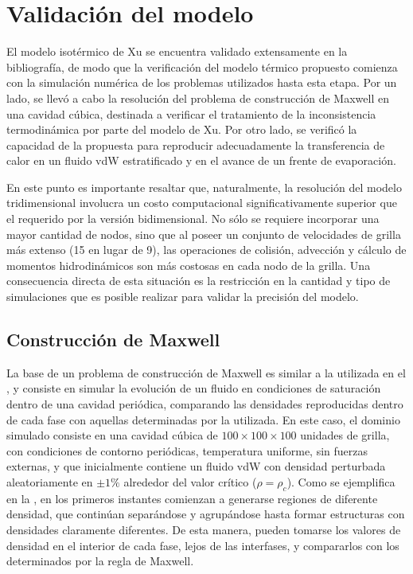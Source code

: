 \section{Validaci\'on del modelo}

El modelo isot\'ermico de Xu  se encuentra validado extensamente en la bibliograf\'ia, de modo que la verificaci\'on del modelo t\'ermico propuesto comienza con la simulaci\'on num\'erica de los problemas utilizados hasta esta etapa. Por un lado, se llev\'o a cabo la resoluci\'on del problema de construcci\'on de Maxwell en una cavidad c\'ubica, destinada a verificar el tratamiento de la inconsistencia termodin\'amica por parte del modelo de Xu. Por otro lado, se verific\'o la capacidad de la \lbe{} propuesta para reproducir adecuadamente la transferencia de calor en un fluido vdW estratificado y en el avance de un frente de evaporaci\'on.

En este punto es importante resaltar que, naturalmente, la resoluci\'on del modelo tridimensional involucra un costo computacional significativamente superior que el requerido por la versi\'on bidimensional. No s\'olo se requiere incorporar una mayor cantidad de nodos, sino que al poseer un conjunto de velocidades de grilla m\'as extenso (15 en lugar de 9), las operaciones de colisi\'on, advecci\'on y c\'alculo de momentos hidrodin\'amicos son m\'as costosas en cada nodo de la grilla. Una consecuencia directa de esta situaci\'on es la restricci\'on en la cantidad y tipo de simulaciones que es posible realizar para validar la precisi\'on del modelo. 

\newpage
\subsection{Construcci\'on de Maxwell} 

La base de un problema de construcci\'on de Maxwell es similar a la utilizada en el , y consiste en simular la evoluci\'on de un fluido en condiciones de saturaci\'on dentro de una cavidad peri\'odica, comparando las densidades reproducidas dentro de cada fase con aquellas determinadas por la \eos{} utilizada. En este caso, el dominio simulado consiste en una cavidad c\'ubica de $100 \times 100 \times 100$ unidades de grilla, con condiciones de contorno peri\'odicas, temperatura uniforme, sin fuerzas externas, y que inicialmente contiene un fluido vdW con densidad perturbada aleatoriamente en  $\pm 1\%$ alrededor del valor cr\'itico ($\rho=\rho_c$). Como se ejemplifica en la , en los primeros instantes comienzan a generarse regiones de diferente densidad, que contin\'uan separ\'andose y agrup\'andose hasta formar estructuras con densidades claramente diferentes. De esta manera, pueden tomarse los valores de densidad en el interior de cada fase, lejos de las interfases, y compararlos con los determinados por la regla de Maxwell.

